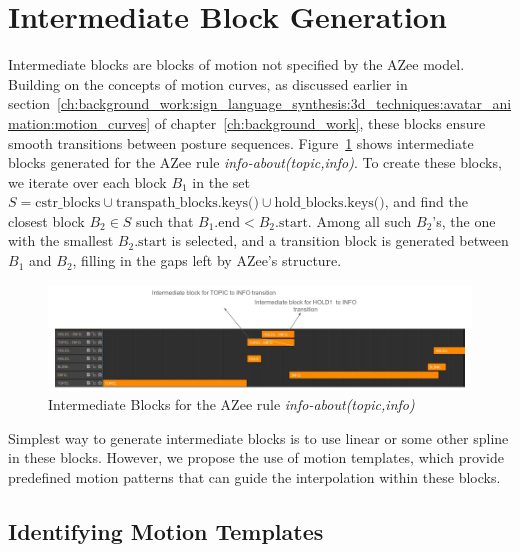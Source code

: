 \documentclass[../../main.tex]{subfiles}
\begin{document}
\section{Intermediate Block Generation}
\label{ch:intermediate_blocks_pose_correction:intermediate_block_generation}

Intermediate blocks are blocks of motion not specified by the AZee model. Building on the concepts of motion curves, as discussed earlier in section~\ref{ch:background_work:sign_language_synthesis:3d_techniques:avatar_animation:motion_curves} of chapter~\ref{ch:background_work}, these blocks ensure smooth transitions between posture sequences. Figure~\ref{fig:info_about_intermediate_example} shows intermediate blocks generated for the AZee rule \emph{info-about(topic,info)}. To create these blocks, we iterate over each block \( B_1 \) in the set \( S = \text{cstr\_blocks} \cup \text{transpath\_blocks.keys()} \cup \text{hold\_blocks.keys()} \), and find the closest block \( B_2 \in S \) such that \( B_1.\text{end} < B_2.\text{start} \). Among all such \( B_2 \)'s, the one with the smallest \( B_2.\text{start} \) is selected, and a transition block is generated between \( B_1 \) and \( B_2 \), filling in the gaps left by AZee’s structure.

\begin{figure}
    \centering \includegraphics[width = 5in]{chapters/intermediate_blocks_pose_correction/images/info_about_intermediate_example.png}
    \caption{Intermediate Blocks for the AZee rule \emph{info-about(topic,info)}}
    \label{fig:info_about_intermediate_example}
\end{figure}

Simplest way to generate intermediate blocks is to use linear or some other spline in these blocks. However, we propose the use of motion templates, which provide predefined motion patterns that can guide the interpolation within these blocks.

\subsection{Identifying Motion Templates}
\label{ch:intermediate_blocks_pose_correction:identifying_motion_templates}
\end{document}
